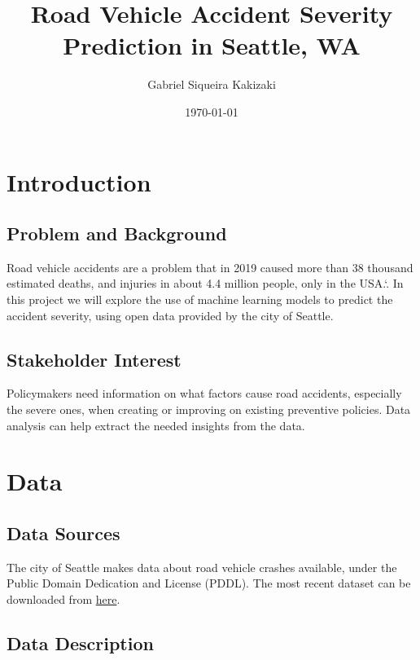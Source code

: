 \documentclass[12pt]{article}
\author{Gabriel Siqueira Kakizaki}
\date{\today}
\title{\textbf{Road Vehicle Accident Severity Prediction in Seattle, WA}}
\begin{document}
\maketitle



\section{Introduction}

\subsection{Problem and Background}

Road vehicle accidents are a problem that in 2019 caused more than 38 thousand estimated deaths, and injuries in about 4.4 million people, only in the USA.\spacefactor\sfcode`.{} In this project we will explore the use of machine learning models to predict the accident severity, using open data provided by the city of Seattle.

\subsection{Stakeholder Interest}

Policymakers need information on what factors cause road accidents, especially the severe ones, when creating or improving on existing preventive policies. Data analysis can help extract the needed insights from the data.

\section{Data}

\subsection{Data Sources}

The city of Seattle makes data about road vehicle crashes available, under the Public Domain Dedication and License (PDDL). The most recent dataset can be downloaded from \href{https://data-seattlecitygis.opendata.arcgis.com/datasets/collisions}{here}.

\subsection{Data Description}
\end{document}
